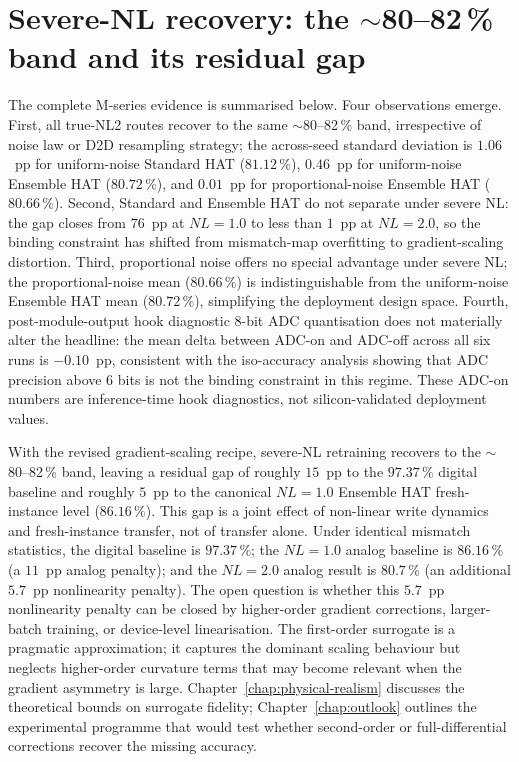 \section{Severe-NL recovery: the \texorpdfstring{$\sim$80--82\,\%}{~80--82\%} band and its residual gap}
\label{sec:severe-nl-band}

The complete M-series evidence is summarised below.  Four observations emerge.  First, all true-NL2 routes recover to the same $\sim$80--82\,\% band, irrespective of noise law or D2D resampling strategy; the across-seed standard deviation is $1.06$~pp for uniform-noise Standard HAT ($81.12\,\%$), $0.46$~pp for uniform-noise Ensemble HAT ($80.72\,\%$), and $0.01$~pp for proportional-noise Ensemble HAT ($80.66\,\%$).  Second, Standard and Ensemble HAT do not separate under severe NL: the gap closes from $76$~pp at $NL=1.0$ to less than $1$~pp at $NL=2.0$, so the binding constraint has shifted from mismatch-map overfitting to gradient-scaling distortion.  Third, proportional noise offers no special advantage under severe NL; the proportional-noise mean ($80.66\,\%$) is indistinguishable from the uniform-noise Ensemble HAT mean ($80.72\,\%$), simplifying the deployment design space.  Fourth, post-module-output hook diagnostic 8-bit ADC quantisation does not materially alter the headline: the mean delta between ADC-on and ADC-off across all six runs is $-0.10$~pp, consistent with the iso-accuracy analysis showing that ADC precision above 6 bits is not the binding constraint in this regime.  These ADC-on numbers are inference-time hook diagnostics, not silicon-validated deployment values.

With the revised gradient-scaling recipe, severe-NL retraining recovers to the $\sim$80--82\,\% band, leaving a residual gap of roughly $15$~pp to the $97.37\,\%$ digital baseline and roughly $5$~pp to the canonical $NL=1.0$ Ensemble HAT fresh-instance level ($86.16\,\%$).  This gap is a joint effect of non-linear write dynamics and fresh-instance transfer, not of transfer alone.  Under identical mismatch statistics, the digital baseline is $97.37\,\%$; the $NL=1.0$ analog baseline is $86.16\,\%$ (a $11$~pp analog penalty); and the $NL=2.0$ analog result is $80.7\,\%$ (an additional $5.7$~pp nonlinearity penalty).  The open question is whether this $5.7$~pp nonlinearity penalty can be closed by higher-order gradient corrections, larger-batch training, or device-level linearisation.  The first-order surrogate is a pragmatic approximation; it captures the dominant scaling behaviour but neglects higher-order curvature terms that may become relevant when the gradient asymmetry is large.  Chapter~\ref{chap:physical-realism} discusses the theoretical bounds on surrogate fidelity; Chapter~\ref{chap:outlook} outlines the experimental programme that would test whether second-order or full-differential corrections recover the missing accuracy.

